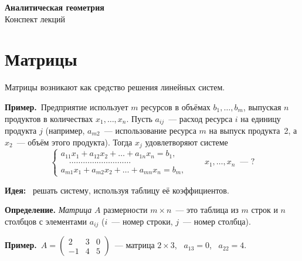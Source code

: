 \documentclass[a4paper,11pt]{article}
\newcommand{\lead}[1]{\textbf{\color{leadcol}#1}\ }
\newcommand{\prim}{\textbf{Пример.}\ }
\begin{document}
\begin{center}
{\LARGE\bfseries\color{secred}Аналитическая геометрия}\\[3pt]
{\large Конспект лекций}
\end{center}
\vspace{-2mm}

\tableofcontents
\newpage


\section{Матрицы}
Матрицы возникают как средство решения линейных систем.

\prim Предприятие использует $m$ ресурсов в объёмах $b_1,\dots,b_m$, выпуская $n$ продуктов
в количествах $x_1,\dots,x_n$. Пусть $a_{ij}$~--- расход ресурса $i$ на единицу продукта $j$
(например, $a_{m2}$~--- использование ресурса $m$ на выпуск продукта \textnumero\,2, а $x_2$~--- объём
этого продукта). Тогда $x_j$ удовлетворяют системе
\[
\begin{cases}
a_{11}x_1+a_{12}x_2+\dots+a_{1n}x_n=b_1,\\
\quad\dots\dots\dots\dots\dots\dots\dots\dots\dots\\
a_{m1}x_1+a_{m2}x_2+\dots+a_{mn}x_n=b_m,
\end{cases}
\qquad x_1,\dots,x_n\ \text{~--- ?}
\]

\lead{Идея:} решать систему, используя таблицу её коэффициентов.

\begin{opr}
\textbf{Определение.} \emph{Матрица} $A$ размерности $m\times n$~--- это таблица из $m$ строк
и $n$ столбцов с элементами $a_{ij}$ ($i$~--- номер строки, $j$~--- номер столбца).
\end{opr}

\prim $A=\begin{pmatrix}2&3&0\\-1&4&5\end{pmatrix}$~--- матрица $2\times3$, \ $a_{13}=0$, \ $a_{22}=4$.
\end{document}
